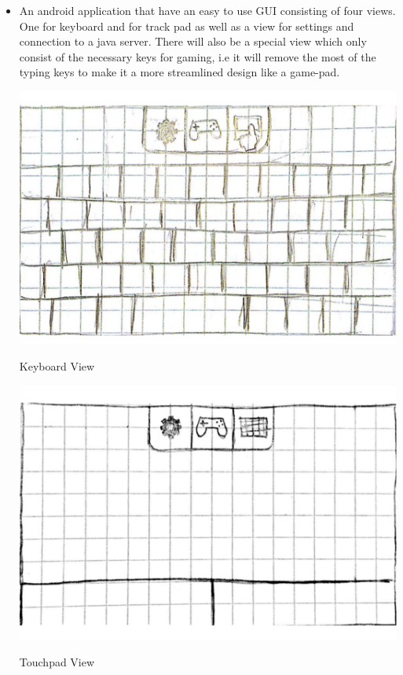 \documentclass[11pt]{article}
\begin{document}
\begin{itemize}
\item {
An android application that have an easy to use GUI consisting of four views. One for keyboard and for track  pad as well as a view for settings and connection to a java server. There will also be a special view which only consist of the necessary keys for gaming, i.e it will remove the most of the typing keys to make it a more streamlined design like a game-pad.




\includegraphics[scale=0.2]{keyboardView}

Keyboard View

\includegraphics[scale=0.2]{touchpadView}

Touchpad View

}
\end{itemize}
\end{document}
